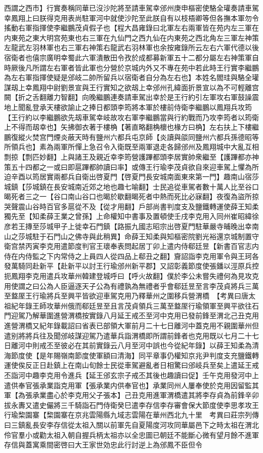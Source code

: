 西謂之西市】行實奏稱同華已沒沙陀將至請車駕幸邠州庚申樞密使駱全瓘奏請車駕幸鳳翔上曰朕得克用表尚駐軍河中就使沙陀至此朕自有以枝梧卿等但各撫本軍勿令搖動右軍指揮使李繼鵬茂貞假子也【程大昌雍錄曰北軍左右兩軍皆在苑内左三軍在内東苑之東大明宫苑東也右三軍在九仙門之西九仙在内東苑之西北角左三軍左神策左龍武左羽林軍也右三軍右神策右龍武右羽林軍也余按雍錄所云左右六軍代德以後宿衛者也僖宗廣明幸蜀此六軍潰散田令孜於成都募新軍五十二都分屬左右神策軍自時厥後凡所謂左右軍者皆此軍也分營於京城内外又不專在苑中若此時王行實李繼鵬為左右軍指揮使疑是邠岐二帥所留兵以宿衛者自分為左右也】本姓名閻珪與駱全瓘謀刼上幸鳳翔中尉劉景宣與王行實知之欲刼上幸邠州孔緯面折景宣以為不可輕離宫闕【折之舌翻離力智翻】向晚繼鵬連奏請車駕出幸於是王行約引左軍攻右軍鼓譟震地上聞亂登承天樓欲諭止之捧日都頭李筠將本軍於樓前侍衛李繼鵬以鳳翔兵攻筠【王行約以李繼鵬欲先刼車駕幸岐故攻右軍李繼鵬當與行約戰而乃攻李筠者以筠衛上不得而刼幸也】矢拂御衣著于樓桷【著直略翻桷櫰也椽方曰桷】左右扶上下樓繼鵬復縱火焚宫門煙炎蔽天時有鹽州六都兵屯京師【炎讀與燄同鹽州六都兵孫德昭等所領兵也】素為兩軍所憚上急召令入衛既至兩軍退走各歸邠州及鳳翔城中大亂互相剽掠【剽匹妙翻】上與諸王及親近幸李筠營護蹕都頭李居實帥衆繼至【護蹕都亦神策五十四都之一或曰即扈蹕都帥讀曰率】或傳王行瑜李茂貞欲自來迎車駕上懼為所迫辛酉以筠居實兩都兵自衛出啓夏門【啓夏門長安城南面東來第一門】趣南山宿莎城鎮【莎城鎮在長安城南近郊之地也趣七喻翻】士民追從車駕者數十萬人比至谷口暍死者三之一【谷口南山谷口也暍於歇翻暍死者中熱而死比必寐翻】夜復為盜所掠哭聲震山谷時百官多扈從不及【從才用翻】戶部尚書判度支及鹽鐵轉運使薛王知柔獨先至【知柔薛王業之曾孫】上命權知中書事及置頓使壬戌李克用入同州崔昭緯徐彦若王摶至莎城甲子上徙幸石門鎮【路振九國志昭宗出啓夏門駐華嚴寺晡晚出幸南山之莎城駐于石門山之佛寺與此稍異】命薛王知柔與知樞密院劉光裕還京城制置守衛宫禁丙寅李克用遣節度判官王瓌奉表問起居丁卯上遣内侍郗廷昱【新書百官志内侍在内侍監之下内常侍之上員四人從四品上郗丑之翻】齎詔詣李克用軍令與王珂各發萬騎同赴新平【赴新平以討王行瑜邠州新平郡】又詔彰義節度使張鐇以涇原兵控扼鳳翔李克用遣兵攻華州韓建登城呼曰【呼火故翻】僕於李公未嘗失禮何為見攻克用使謂之曰公為人臣逼逐天子公為有禮孰為無禮者乎會郗廷昱至言李茂貞將兵三萬至盩厔王行瑜將兵至興平皆欲迎車駕克用乃釋華州之圍移兵營渭橋　【考異曰唐太祖紀年錄王師攻華州俄而郗廷昱至且言茂貞領兵三萬至盩厔行瑜領軍至興平欲往石門迎駕乃解華圍進營渭橋按實錄八月延王戒丕至河中克用已發前鋒至渭北己丑克用進營渭橋又紀年錄載詔曰省表已部領大軍前月二十七日離河中蓋克用不親圍華州但遣别將將兵往及聞邠岐謀迎駕乃遣華兵詣渭橋即所謂前鋒者也克用既以七月二十七日離河中則戒丕至彼必在其前實錄云八月至河中誤也今從紀年錄】以薛王知柔為清海節度使【是年賜嶺南節度使軍額曰清海】同平章事仍權知京兆尹判度支充鹽鐵轉運使俟反正日赴鎮上在南山旬餘士民從車駕避亂者日相驚曰邠岐兵至矣上遣延王戒丕詣河中趣李克用令進兵【延王邠玄宗子戒丕其後也趣讀曰促】壬午克用發河中上遣供奉官張承業詣克用軍【張承業内供奉官也】承業同州人屢奉使於克用因留監其軍【為張承業盡心於李克用父子張本】己丑克用進軍渭橋遣其將李存貞為前鋒辛卯拔永夀又遣史儼將三千騎詣石門侍衛癸巳遣李存信李存審會保大節度使李思孝攻王行瑜棃園寨【棃園寨在京兆雲陽縣九域志雲陽在華州西北九十里　考異曰莊宗列傳曰三鎮亂長安李存信從太祖入關以前軍先自夏陽度河攻同華屬邑下之時太祖在渭北伶官羣小或勸太祖入朝自握兵柄太祖亦以全忠圖已朝廷不能斷心微有望月餘不進軍存信與蓋寓乘間密啓曰大王家世効忠此行討逆上為邠鳳不臣但令